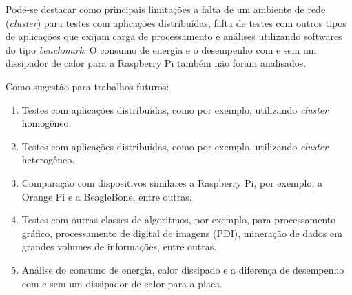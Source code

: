 Pode-se destacar como principais limitações a falta de um ambiente de rede (\textit{cluster}) para testes com aplicações distribuídas, falta de testes com outros tipos de aplicações que exijam carga de processamento e análises utilizando softwares do tipo \textit{benchmark}. O consumo de energia e o desempenho com e sem um dissipador de calor para a Raspberry Pi também não foram analisados.

Como sugestão para trabalhos futuros:

\begin{enumerate}
	\item Testes com aplicações distribuídas, como por exemplo, utilizando \textit{cluster} homogêneo.
	
	\item Testes com aplicações distribuídas, como por exemplo, utilizando \textit{cluster} heterogêneo.
	
	\item Comparação com dispositivos similares a Raspberry Pi, por exemplo, a Orange Pi e a BeagleBone, entre outras.
	
	\item Testes com outras classes de algoritmos, por exemplo, para processamento gráfico, processamento de digital de imagens (PDI), mineração de dados em grandes volumes de informações, entre outras.
	
	\item Análise do consumo de energia, calor dissipado e a diferença de desempenho com e sem um dissipador de calor para a placa.
\end{enumerate}